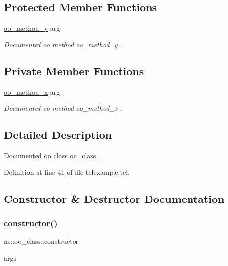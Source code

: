 \subsection*{Protected Member Functions}
\begin{DoxyCompactItemize}
\item 
\mbox{\hyperlink{classns_1_1oo__class_ad07feb192f34010ed66d123338c7acdd}{oo\+\_\+method\+\_\+y}} arg
\begin{DoxyCompactList}\small\item\em Documented oo method {\ttfamily oo\+\_\+method\+\_\+y} . \end{DoxyCompactList}\end{DoxyCompactItemize}
\subsection*{Private Member Functions}
\begin{DoxyCompactItemize}
\item 
\mbox{\hyperlink{classns_1_1oo__class_a96fc5f92e0f8cb7a06d468a650141d59}{oo\+\_\+method\+\_\+x}} arg
\begin{DoxyCompactList}\small\item\em Documented oo method {\ttfamily oo\+\_\+method\+\_\+x} . \end{DoxyCompactList}\end{DoxyCompactItemize}


\subsection{Detailed Description}
Documented oo class {\ttfamily \mbox{\hyperlink{classns_1_1oo__class}{oo\+\_\+class}}} . 

Definition at line 41 of file tclexample.\+tcl.



\subsection{Constructor \& Destructor Documentation}
\mbox{\label{classns_1_1oo__class_aa26b64151d4b4b0e8b4977aae7048f9b}} 
\subsubsection{\texorpdfstring{constructor()}{constructor()}}
{\footnotesize\ttfamily ns\+::oo\+\_\+class\+::constructor\begin{DoxyParamCaption}\item[{}]{args  }\end{DoxyParamCaption}}



